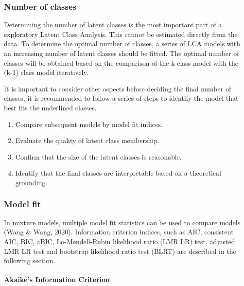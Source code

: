 \documentclass[12pt,a4paper,oneside]{reedthesis}
\providecommand{\tightlist}{%
  \setlength{\itemsep}{0pt}\setlength{\parskip}{0pt}}
\begin{document}
\hypertarget{number-of-classes}{%
\subsubsection{Number of classes}\label{number-of-classes}}

Determining the number of latent classes is the most important part of a exploratory Latent Class Analysis. This cannot be estimated directly from the data. To determine the optimal number of classes, a series of LCA models with an increasing number of latent classes should be fitted. The optimal number of classes will be obtained based on the comparison of the k-class model with the (k-1) class model iteratively.

It is important to consider other aspects before deciding the final number of classes, it is recommended to follow a series of steps to identify the model that best fits the underlined classes.
\begin{enumerate}
\def\labelenumi{\alph{enumi})}
\tightlist
\item
  Compare subsequent models by model fit indices.\\
\item
  Evaluate the quality of latent class membership.\\
\item
  Confirm that the size of the latent classes is reasonable.\\
\item
  Identify that the final classes are interpretable based on a theoretical grounding.
\end{enumerate}
\hypertarget{model-fit}{%
\subsubsection{Model fit}\label{model-fit}}

In mixture models, multiple model fit statistics can be used to compare models (Wang \& Wang, 2020). Information criterion indices, such as AIC, consistent AIC, BIC, aBIC, Lo-Mendell-Rubin likelihood ratio (LMR LR) test, adjusted LMR LR test and bootstrap likelihood ratio test (BLRT) are described in the following section.

\newpage

\hypertarget{akaikes-information-criterion}{%
\paragraph{Akaike's Information Criterion}\label{akaikes-information-criterion}}
\end{document}
